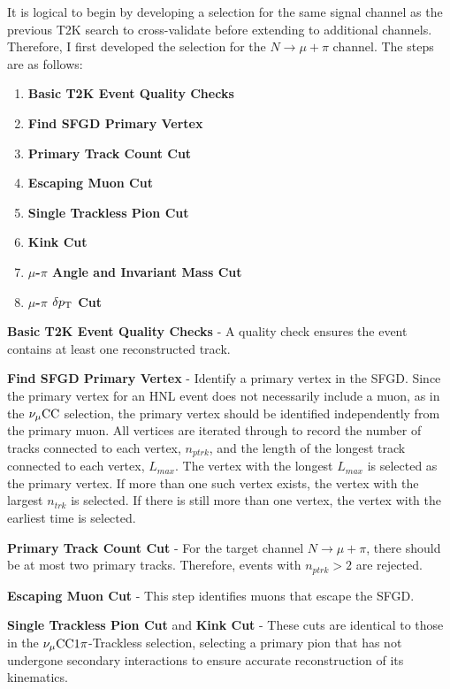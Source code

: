         It is logical to begin by developing a selection for the same signal channel as the previous T2K search to cross-validate before extending to additional channels. Therefore, I first developed the selection for the $N\rightarrow\mu+\pi$ channel. The steps are as follows:

        \begin{enumerate}
            \item \textbf{Basic T2K Event Quality Checks} 
            \item \textbf{Find SFGD Primary Vertex} 
            \item \textbf{Primary Track Count Cut} 
            \item \textbf{Escaping Muon Cut} 
            \item \textbf{Single Trackless Pion Cut}
            \item \textbf{Kink Cut}
            \item \textbf{$\mu$-$\pi$ Angle and Invariant Mass Cut}
            \item \textbf{$\mu$-$\pi$ $\delta p_\textrm{T}$ Cut}
        \end{enumerate}

        \textbf{Basic T2K Event Quality Checks} - A quality check ensures the event contains at least one reconstructed track.

        \textbf{Find SFGD Primary Vertex} - Identify a primary vertex in the SFGD. 
        Since the primary vertex for an HNL event does not necessarily include a muon, as in the $\nu_{\mu}\textrm{CC}$ selection, the primary vertex should be identified independently from the primary muon. 
        All vertices are iterated through to record the number of tracks connected to each vertex, $n_{ptrk}$, and the length of the longest track connected to each vertex, $L_{max}$. 
        The vertex with the longest $L_{max}$ is selected as the primary vertex. 
        If more than one such vertex exists, the vertex with the largest $n_{trk}$ is selected. 
        If there is still more than one vertex, the vertex with the earliest time is selected.

        \textbf{Primary Track Count Cut} - For the target channel $N\rightarrow\mu+\pi$, there should be at most two primary tracks. Therefore, events with $n_{ptrk}>2$ are rejected.

        \textbf{Escaping Muon Cut} - This step identifies muons that escape the SFGD.

        \textbf{Single Trackless Pion Cut} and \textbf{Kink Cut} - These cuts are identical to those in the $\nu_{\mu}\textrm{CC}1\pi$-Trackless selection, selecting a primary pion that has not undergone secondary interactions to ensure accurate reconstruction of its kinematics.

